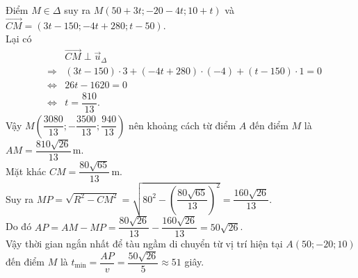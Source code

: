 \begin{ex}
{\begin{itemchoice}
\begin{center}
		\end{center}
		Điểm $M  \in \Delta$ suy ra $M(50+3t;-20-4t;10+t)$ và $\overrightarrow{CM}=(3t-150;-4t+280;t-50)$.\\
		Lại  có
		\begin{eqnarray*}
			&&\overrightarrow{CM} \perp  \overrightarrow{u}_{\Delta}\\
			&\Rightarrow& (3t-150)\cdot 3+(-4t+280)\cdot (-4)+(t-150)\cdot  1=0\\
			&\Leftrightarrow& 26t-1620=0  \\
			 &\Leftrightarrow& t=\dfrac{810}{13}.
		\end{eqnarray*}
		Vậy $M\left(\dfrac{3080}{13};-\dfrac{3500}{13}; \dfrac{940}{13} \right)$  nên khoảng cách từ điểm $A$ đến điểm $M$ là $AM=\dfrac{810\sqrt{26}}{13}$\,m.\\
		Mặt  khác $CM=\dfrac{80\sqrt{65}}{13}$\,m.\\
		Suy  ra $MP=\sqrt{R^2-CM^2}=\sqrt{80^2-\left(\dfrac{80\sqrt{65}}{13}\right)^2}=\dfrac{160\sqrt{26}}{13}$.\\
		Do đó $AP=AM-MP=\dfrac{80\sqrt{26}}{13}-\dfrac{160\sqrt{26}}{13}=50\sqrt{26}$.\\ 
		Vậy thời  gian ngắn nhất để tàu ngầm di chuyển từ vị trí hiện tại $A(50;-20;10)$ đến điểm $M$ là
		 $t_{\min}=\dfrac{AP}{v}=\dfrac{50\sqrt{26}}{5}\approx 51$ giây.
	\end{itemchoice}
 }
\end{ex}

